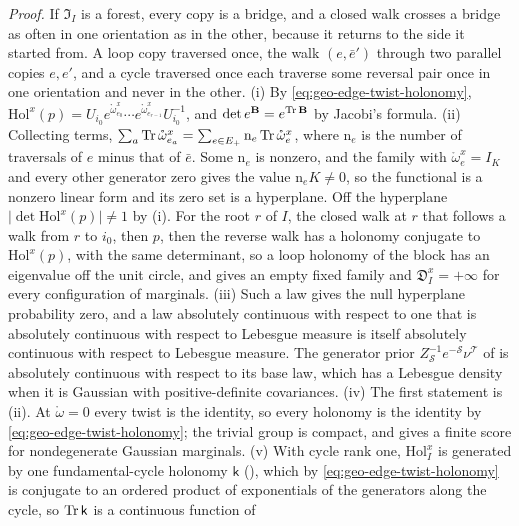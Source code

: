 \noindent\emph{Proof.}
If \(\mathfrak I_I\) is a forest, every copy is a bridge, and a closed walk crosses a bridge as often in one
orientation as in the other, because it returns to the side it started from. A loop copy traversed once,
the walk \((e,\bar e')\) through two parallel copies \(e,e'\), and a cycle traversed once each traverse some
reversal pair once in one orientation and never in the other.
(i) By \eqref{eq:geo-edge-twist-holonomy},
\(\mathrm{Hol}^x(p)=U_{i_0}e^{\mathring\omega^x_{e_0}}\cdots e^{\mathring\omega^x_{e_{r-1}}}U_{i_0}^{-1}\), and
\(\det e^{\mathbf B}=e^{\operatorname{Tr}\mathbf B}\) by Jacobi's formula.
(ii) Collecting terms, \(\sum_a\operatorname{Tr}\mathring\omega^x_{e_a}=\sum_{e\in E_+}\mathrm n_e\operatorname{Tr}\mathring\omega^x_e\), where
\(\mathrm n_e\) is the number of traversals of \(e\) minus that of \(\bar e\). Some \(\mathrm n_e\) is nonzero,
and the family with \(\mathring\omega^x_e=I_K\) and every other generator zero gives the value
\(\mathrm n_eK\neq0\), so the functional is a nonzero linear form and its zero set is a hyperplane. Off the
hyperplane \(\lvert\det\mathrm{Hol}^x(p)\rvert\neq1\) by (i). For the root \(r\) of \(I\), the closed walk at
\(r\) that follows a walk from \(r\) to \(i_0\), then \(p\), then the reverse walk has a holonomy conjugate to
\(\mathrm{Hol}^x(p)\), with the same determinant, so a loop holonomy of the block has an eigenvalue off the
unit circle, and  gives an empty fixed family and
\(\mathfrak D^x_I=+\infty\) for every configuration of marginals.
(iii) Such a law gives the null hyperplane probability zero, and a law absolutely continuous with respect
to one that is absolutely continuous with respect to Lebesgue measure is itself absolutely continuous with
respect to Lebesgue measure. The generator prior \(Z_{\mathscr S}^{-1}e^{-\mathscr S}\nu^{\mathscr T}\) of
 is absolutely continuous with respect to its base law, which has a Lebesgue
density when it is Gaussian with positive-definite covariances.
(iv) The first statement is (ii). At \(\mathring\omega=0\) every twist is the identity, so every holonomy is
the identity by \eqref{eq:geo-edge-twist-holonomy}; the trivial group is compact, and
 gives a finite score for nondegenerate Gaussian marginals.
(v) With cycle rank one, \(\mathrm{Hol}^x_I\) is generated by one fundamental-cycle holonomy \(\mathsf k\)
(), which by \eqref{eq:geo-edge-twist-holonomy} is conjugate to an ordered product
of exponentials of the generators along the cycle, so \(\operatorname{Tr}\mathsf k\) is a continuous function of
